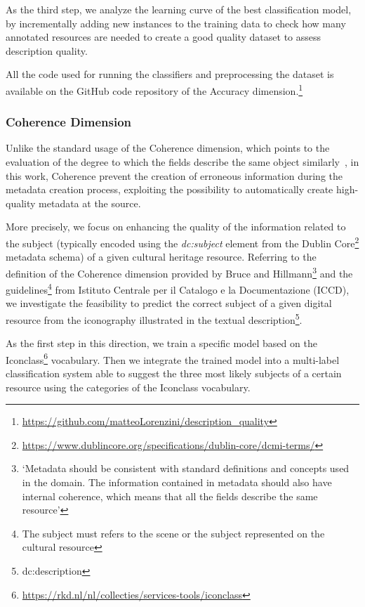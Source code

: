 \documentclass[epsfig,a4paper,12pt,titlepage]{book}
\begin{document}
As the third step, we analyze the learning curve of the best classification model, by incrementally adding new instances to the training data to check how many annotated resources are needed to create a good quality dataset to assess description quality.

All the code used for running the classifiers and preprocessing the dataset is available on the GitHub code repository of the Accuracy dimension.\footnote{\url{https://github.com/matteoLorenzini/description_quality}}



\subsubsection{Coherence Dimension}
Unlike the standard usage of the Coherence dimension, which points to the evaluation of the degree to which the fields describe the same object similarly~\cite{1}, in this work, Coherence prevent the creation of erroneous information during the metadata creation process, exploiting the possibility to automatically create high-quality metadata at the source. 

More precisely, we focus on enhancing the quality of the information related to the subject  (typically encoded using the  \textit{dc:subject} element from the Dublin Core\footnote{\url{https://www.dublincore.org/specifications/dublin-core/dcmi-terms/}} metadata schema) of a given cultural heritage resource. 
Referring to the definition of the Coherence dimension provided by Bruce and Hillmann\footnote{`Metadata should be consistent with standard definitions and concepts used in
the domain. The information contained in metadata should also have internal coherence, which means that all the fields describe the same resource'} and the guidelines\footnote{The subject must refers to the scene or the subject represented on the cultural resource} from Istituto Centrale per il Catalogo e la Documentazione (ICCD), we investigate the feasibility to predict the correct subject of a given digital resource from the iconography illustrated in the textual description\footnote{dc:description}.

As the first step in this direction, we train a specific model based on the Iconclass\footnote{\url{https://rkd.nl/nl/collecties/services-tools/iconclass}} vocabulary. Then we integrate the trained model into a multi-label classification system able to suggest the three most likely subjects of a certain resource using the categories of the Iconclass vocabulary.   
\end{document}
